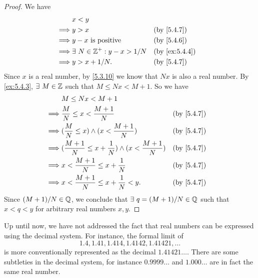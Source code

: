 \begin{proof}
  We have
  \begin{align*}
             & x < y                                                                \\
    \implies & y > x                               &  & \text{(by \cref{5.4.7})}    \\
    \implies & y - x \text{ is positive}           &  & \text{(by \cref{5.4.6})}    \\
    \implies & \exists\ N \in \Z^+ : y - x > 1 / N &  & \text{(by \cref{ex:5.4.4})} \\
    \implies & y > x + 1 / N.                      &  & \text{(by \cref{5.4.7})}    \\
  \end{align*}
  Since \(x\) is a real number, by \cref{5.3.10} we know that \(Nx\) is also a real number.
  By \cref{ex:5.4.3}, \(\exists\ M \in \mathbb{Z}\) such that \(M \leq Nx < M + 1\).
  So we have
  \begin{align*}
             & M \leq Nx < M + 1                                                                                   \\
    \implies & \dfrac{M}{N} \leq x < \dfrac{M + 1}{N}                                &  & \text{(by \cref{5.4.7})} \\
    \implies & (\dfrac{M}{N} \leq x) \land (x < \dfrac{M + 1}{N})                    &  & \text{(by \cref{5.4.7})} \\
    \implies & (\dfrac{M + 1}{N} \leq x + \dfrac{1}{N}) \land (x < \dfrac{M + 1}{N}) &  & \text{(by \cref{5.4.7})} \\
    \implies & x < \dfrac{M + 1}{N} \leq x + \dfrac{1}{N}                            &  & \text{(by \cref{5.4.7})} \\
    \implies & x < \dfrac{M + 1}{N} \leq x + \dfrac{1}{N} < y.                       &  & \text{(by \cref{5.4.7})}
  \end{align*}
  Since \((M + 1) / N \in \mathbb{Q}\), we conclude that \(\exists\ q = (M + 1) / N \in \mathbb{Q}\) such that \(x < q < y\) for arbitrary real numbers \(x, y\).
\end{proof}

\begin{rmk}\label{5.4.15}
  Up until now, we have not addressed the fact that real numbers can be expressed using the decimal system.
  For instance, the formal limit of
  \[
    1.4, 1.41, 1.414, 1.4142, 1.41421, \dots
  \]
  is more conventionally represented as the decimal \(1.41421\dots\).
  There are some subtleties in the decimal system, for instance \(0.9999\dots\) and \(1.000\dots\) are in fact the same real number.
\end{rmk}

